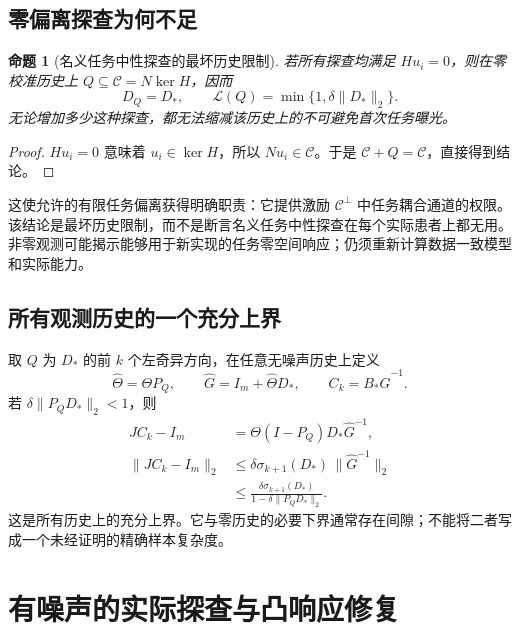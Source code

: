 \documentclass[11pt,a4paper]{article}
\numberwithin{equation}{section}
\newtheorem{proposition}[theorem]{命题}
\theoremstyle{definition}
\begin{document}
\subsection{零偏离探查为何不足}

\begin{proposition}[名义任务中性探查的最坏历史限制]
\label{prop:cal-neutral}
若所有探查均满足 $Hu_i=0$，则在零校准历史上 $Q\subseteq\mathcal C=N\ker H$，因而
\begin{equation}
  D_Q=D_*,
  \qquad
  \mathcal L(Q)=\min\{1,\delta\|D_*\|_2\}.
  \label{eq:cal-neutral-no-width}
\end{equation}
无论增加多少这种探查，都无法缩减该历史上的不可避免首次任务曝光。
\end{proposition}

\begin{proof}
$Hu_i=0$ 意味着 $u_i\in\ker H$，所以 $Nu_i\in\mathcal C$。于是 $\mathcal C+Q=\mathcal C$，直接得到结论。
\end{proof}

这使允许的有限任务偏离获得明确职责：它提供激励 $\mathcal C^\perp$ 中任务耦合通道的权限。该结论是最坏历史限制，而不是断言名义任务中性探查在每个实际患者上都无用。非零观测可能揭示能够用于新实现的任务零空间响应；仍须重新计算数据一致模型和实际能力。

\subsection{所有观测历史的一个充分上界}

取 $Q$ 为 $D_*$ 的前 $k$ 个左奇异方向，在任意无噪声历史上定义
\begin{equation}
  \widehat\Theta=\Theta P_Q,\qquad
  \widehat G=I_m+\widehat\Theta D_*,
  \qquad C_k=B_*\widehat G^{-1}.
\end{equation}
若 $\delta\|P_QD_*\|_2<1$，则
\begin{align}
  JC_k-I_m
  &=\Theta(I-P_Q)D_*\widehat G^{-1},\\
  \|JC_k-I_m\|_2
  &\le
  \delta\sigma_{k+1}(D_*)\,
  \|\widehat G^{-1}\|_2\\
  &\le
  \frac{\delta\sigma_{k+1}(D_*)}
  {1-\delta\|P_QD_*\|_2}.
  \label{eq:cal-nonzero-upper}
\end{align}
这是所有历史上的充分上界。它与零历史的必要下界通常存在间隙；不能将二者写成一个未经证明的精确样本复杂度。

\section{有噪声的实际探查与凸响应修复}
\label{sec:cal-noisy}
\end{document}
